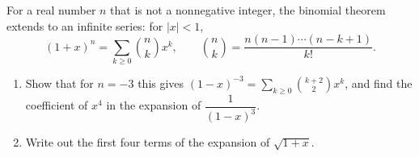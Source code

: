 For a real number $n$ that is not a nonnegative integer, the binomial theorem extends to an infinite series: for $|x|<1$,
\[
(1+x)^n=\sum_{k\ge0}\binom{n}{k}x^k,\qquad \binom nk=\dfrac{n(n-1)\cdots(n-k+1)}{k!}.
\]
\begin{enumerate}
\item[(a)] Show that for $n=-3$ this gives $(1-x)^{-3}=\displaystyle\sum_{k\ge0}\binom{k+2}{2}x^k$, and find the coefficient of $x^4$ in the expansion of $\dfrac{1}{(1-x)^3}$.
\item[(b)] Write out the first four terms of the expansion of $\sqrt{1+x}$.
\end{enumerate}
